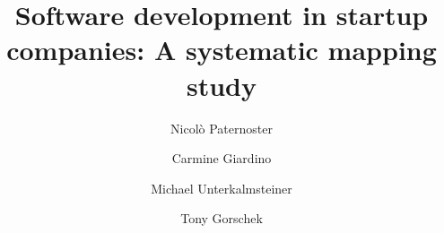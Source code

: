 \documentclass[final,5p,times,twocolumn]{elsarticle}
\begin{document}
\begin{frontmatter}



\title{Software development in startup companies: A systematic mapping study}



\author[bth]{Nicol\`{o} Paternoster}
\author[bth]{Carmine Giardino}
\author[bth]{Michael Unterkalmsteiner}
\author[bth]{Tony Gorschek}

\address[bth]{Software Engineering Research Lab, Blekinge Institute of Technology, SE-371 79 Karlskrona, Sweden}



\end{frontmatter}
\end{document}
